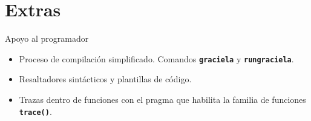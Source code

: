 \section{Extras}

\pragma{
\begin{lstlisting}[language=graciela, style=code, escapechar=\~]
/*% LANGUAGE Trace %*/
\end{lstlisting}
}

\begin{frame}{Apoyo al programador}
\begin{itemize}
  \item Proceso de compilación simplificado. Comandos \texttt{\textbf{graciela}} y \texttt{\textbf{rungraciela}}.
  \item Resaltadores sintácticos y plantillas de código.
  \item Trazas dentro de funciones con el pragma
  \pragma
  que habilita la familia de funciones \texttt{\textbf{trace()}}.
\end{itemize}
\end{frame}


